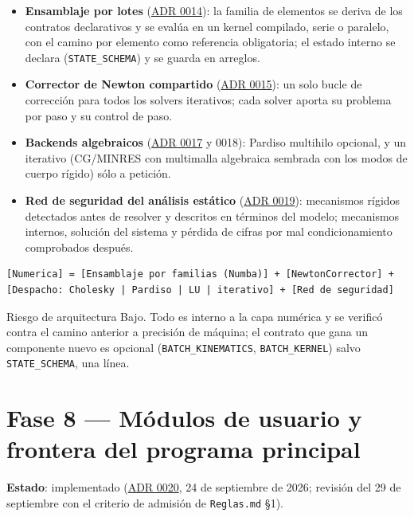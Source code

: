 \documentclass[11pt,oneside]{report}
\begin{document}
\begin{itemize}
  \item \textbf{Ensamblaje por lotes} (\hyperref[adr:0014]{ADR 0014}): la familia de elementos se deriva de los contratos declarativos y se evalúa en un kernel compilado, serie o paralelo, con el camino por elemento como referencia obligatoria; el estado interno se declara (\texttt{STATE\_SCHEMA}) y se guarda en arreglos.
  \item \textbf{Corrector de Newton compartido} (\hyperref[adr:0015]{ADR 0015}): un solo bucle de corrección para todos los solvers iterativos; cada solver aporta su problema por paso y su control de paso.
  \item \textbf{Backends algebraicos} (\hyperref[adr:0017]{ADR 0017} y 0018): Pardiso multihilo opcional, y un iterativo (CG/MINRES con multimalla algebraica sembrada con los modos de cuerpo rígido) sólo a petición.
  \item \textbf{Red de seguridad del análisis estático} (\hyperref[adr:0019]{ADR 0019}): mecanismos rígidos detectados antes de resolver y descritos en términos del modelo; mecanismos internos, solución del sistema y pérdida de cifras por mal condicionamiento comprobados después.
\end{itemize}

\begin{lstlisting}
[Numerica] = [Ensamblaje por familias (Numba)] + [NewtonCorrector] + [Despacho: Cholesky | Pardiso | LU | iterativo] + [Red de seguridad]

\end{lstlisting}

\begin{infobox}{Riesgo de arquitectura}
Bajo. Todo es interno a la capa numérica y se verificó contra el camino anterior a precisión de máquina; el contrato que gana un componente nuevo es opcional (\texttt{BATCH\_KINEMATICS}, \texttt{BATCH\_KERNEL}) salvo \texttt{STATE\_SCHEMA}, una línea.
\end{infobox}

\section{Fase 8 --- Módulos de usuario y frontera del programa principal}

\textbf{Estado}: implementado (\hyperref[adr:0020]{ADR 0020}, 24 de septiembre de 2026; revisión del 29 de septiembre con el criterio de admisión de \texttt{Reglas.md} §1).
\end{document}
